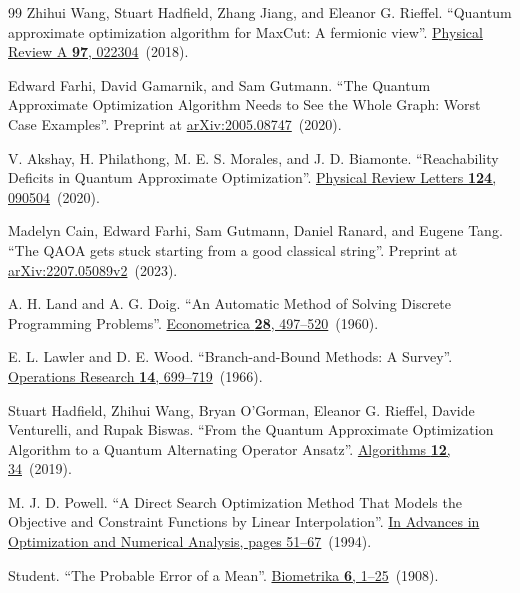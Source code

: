 \documentclass[a4paper,onecolumn,11pt,unpublished]{quantumarticle}
\theoremstyle{remark}
\begin{document}
\begin{thebibliography}{99}
Zhihui Wang, Stuart Hadfield, Zhang Jiang, and Eleanor G. Rieffel.
\newblock ``Quantum approximate optimization algorithm for MaxCut: A fermionic view''.
\newblock \href{https://doi.org/10.1103/physreva.97.022304}{Physical Review A {\bf 97}, 022304}~(2018).

Edward Farhi, David Gamarnik, and Sam Gutmann.
\newblock ``The Quantum Approximate Optimization Algorithm Needs to See the Whole Graph: Worst Case Examples''.
\newblock Preprint at \href{https://arxiv.org/abs/2005.08747}{arXiv:2005.08747}~(2020).

V. Akshay, H. Philathong, M. E. S. Morales, and J. D. Biamonte.
\newblock ``Reachability Deficits in Quantum Approximate Optimization''.
\newblock \href{https://doi.org/10.1103/physrevlett.124.090504}{Physical Review Letters {\bf 124}, 090504}~(2020).

Madelyn Cain, Edward Farhi, Sam Gutmann, Daniel Ranard, and Eugene Tang.
\newblock ``The QAOA gets stuck starting from a good classical string''.
\newblock Preprint at \href{https://arxiv.org/abs/2207.05089v2}{arXiv:2207.05089v2}~(2023).

A. H. Land and A. G. Doig.
\newblock ``An Automatic Method of Solving Discrete Programming Problems''.
\newblock \href{https://doi.org/10.2307/1910129}{Econometrica {\bf 28}, 497--520}~(1960).

E. L. Lawler and D. E. Wood.
\newblock ``Branch-and-Bound Methods: A Survey''.
\newblock \href{https://doi.org/10.1287/opre.14.4.699}{Operations Research {\bf 14}, 699--719}~(1966).

Stuart Hadfield, Zhihui Wang, Bryan O'Gorman, Eleanor G. Rieffel, Davide Venturelli, and Rupak Biswas.
\newblock ``From the Quantum Approximate Optimization Algorithm to a Quantum Alternating Operator Ansatz''.
\newblock \href{https://doi.org/10.3390/a12020034}{Algorithms {\bf 12}, 34}~(2019).

M. J. D. Powell.
\newblock ``A Direct Search Optimization Method That Models the Objective and Constraint Functions by Linear Interpolation''.
\newblock \href{https://doi.org/10.1007/978-94-015-8330-5_4}{In Advances in Optimization and Numerical Analysis, pages 51--67}~(1994).

Student.
\newblock ``The Probable Error of a Mean''.
\newblock \href{https://doi.org/10.2307/2331554}{Biometrika {\bf 6}, 1--25}~(1908).


\end{thebibliography}
\end{document}
